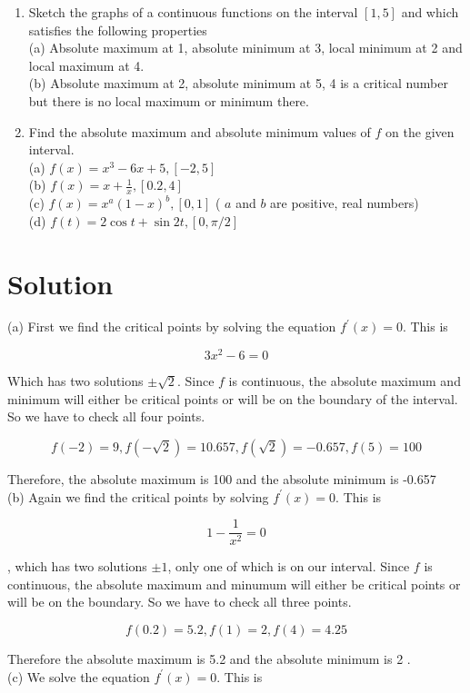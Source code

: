 \documentclass[10pt]{article}
\begin{document}
\begin{enumerate}
  \item Sketch the graphs of a continuous functions on the interval $[1,5]$ and which satisfies the following properties\\
(a) Absolute maximum at 1, absolute minimum at 3, local minimum at 2 and local maximum at 4.\\
(b) Absolute maximum at 2, absolute minimum at 5, 4 is a critical number but there is no local maximum or minimum there.
  \item Find the absolute maximum and absolute minimum values of $f$ on the given interval.\\
(a) $f(x)=x^{3}-6 x+5,[-2,5]$\\
(b) $f(x)=x+\frac{1}{x},[0.2,4]$\\
(c) $f(x)=x^{a}(1-x)^{b},[0,1]$ ( $a$ and $b$ are positive, real numbers)\\
(d) $f(t)=2 \cos t+\sin 2 t,[0, \pi / 2]$
\end{enumerate}

\section*{Solution}
(a) First we find the critical points by solving the equation $f^{\prime}(x)=0$. This is

$$
3 x^{2}-6=0
$$

Which has two solutions $\pm \sqrt{2}$. Since $f$ is continuous, the absolute maximum and minimum will either be critical points or will be on the boundary of the interval. So we have to check all four points.

$$
f(-2)=9, f(-\sqrt{2})=10.657, f(\sqrt{2})=-0.657, f(5)=100
$$

Therefore, the absolute maximum is 100 and the absolute minimum is -0.657\\
(b) Again we find the critical points by solving $f^{\prime}(x)=0$. This is

$$
1-\frac{1}{x^{2}}=0
$$

, which has two solutions $\pm 1$, only one of which is on our interval. Since $f$ is continuous, the absolute maximum and minumum will either be critical points or will be on the boundary. So we have to check all three points.

$$
f(0.2)=5.2, f(1)=2, f(4)=4.25
$$

Therefore the absolute maximum is 5.2 and the absolute minimum is 2 .\\
(c) We solve the equation $f^{\prime}(x)=0$. This is
\end{document}
